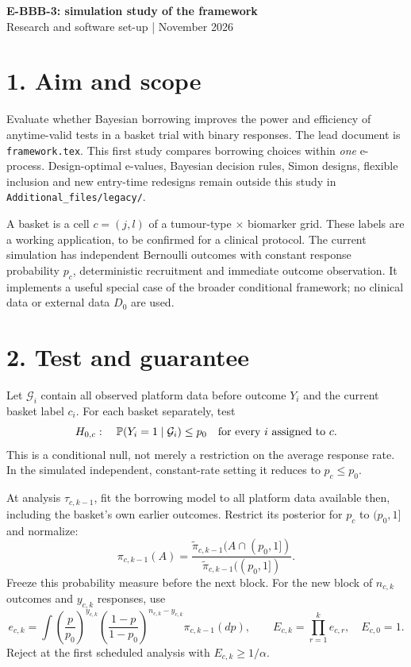 \documentclass[10pt,a4paper]{article}
\newcommand{\Prob}{\mathbb P}
\begin{document}
\begin{center}
{\Large\bfseries E-BBB-3: simulation study of the framework}\\[4pt]
{\small Research and software set-up \enspace| November 2026}
\end{center}
\vspace{-0.5em}

\section*{1. Aim and scope}
Evaluate whether Bayesian borrowing improves the power and efficiency of
anytime-valid tests in a basket trial with binary responses. The lead
document is \texttt{framework.tex}. This first study compares borrowing
choices within \emph{one} e-process. Design-optimal e-values, Bayesian
decision rules, Simon designs, flexible inclusion and new entry-time
redesigns remain outside this study in \texttt{Additional\_files/legacy/}.

A basket is a cell $c=(j,l)$ of a tumour-type $\times$ biomarker grid.
These labels are a working application, to be confirmed for a clinical
protocol. The current simulation has independent Bernoulli outcomes with
constant response probability $p_c$, deterministic recruitment and immediate
outcome observation. It implements a useful special case of the broader
conditional framework; no clinical data or external data $D_0$ are used.

\section*{2. Test and guarantee}
Let $\mathcal G_i$ contain all observed platform data before outcome $Y_i$
and the current basket label $c_i$. For each basket separately, test
\[
 H_{0,c}:\quad \Prob(Y_i=1\mid\mathcal G_i)\le p_0
 \quad\hbox{for every }i\hbox{ assigned to }c.
\]
This is a conditional null, not merely a restriction on the average response
rate. In the simulated independent, constant-rate setting it reduces to
$p_c\le p_0$.

At analysis $\tau_{c,k-1}$, fit the borrowing model to all platform data
available then, including the basket's own earlier outcomes. Restrict its
posterior for $p_c$ to $(p_0,1]$ and normalize:
\[
 \pi_{c,k-1}(A)=
 \frac{\widetilde\pi_{c,k-1}(A\cap(p_0,1])}
      {\widetilde\pi_{c,k-1}((p_0,1])}.
\]
Freeze this probability measure before the next block. For the new block
of $n_{c,k}$ outcomes and $y_{c,k}$ responses, use
\[
 e_{c,k}=\int
 \left(\frac p{p_0}\right)^{y_{c,k}}
 \left(\frac{1-p}{1-p_0}\right)^{n_{c,k}-y_{c,k}}
 \pi_{c,k-1}(dp),\qquad
 E_{c,k}=\prod_{r=1}^k e_{c,r},\quad E_{c,0}=1.
\]
Reject at the first scheduled analysis with $E_{c,k}\ge 1/\alpha$.
\end{document}
